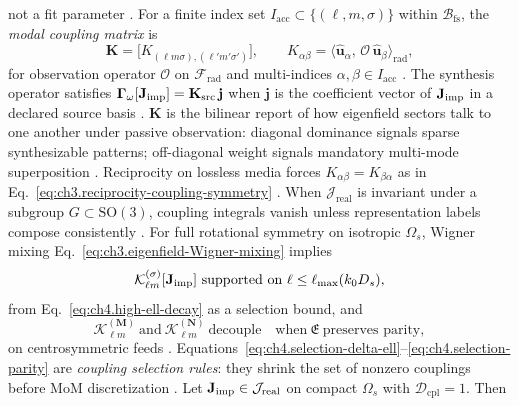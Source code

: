 not a fit parameter \cite{devaney2004}.
\label{def:ch4.modal-coupling-matrix}
For a finite index set \(I_{\mathrm{acc}}\subset\{(\ell,m,\sigma)\}\) within \(\mathcal{B}_{\mathrm{fs}}\), the
\emph{modal coupling matrix} is
\begin{equation}
\label{eq:ch4.modal-coupling-matrix}
\mathbf{K}
=
\big[K_{(\ell m\sigma),(\ell'm'\sigma')}\big],
\qquad
K_{\alpha\beta}
=
\big\langle
\widehat{\mathbf{u}}_{\alpha},\,
\mathcal{O}\,\widehat{\mathbf{u}}_{\beta}
\big\rangle_{\mathrm{rad}},
\end{equation}
for observation operator \(\mathcal{O}\) on \(\mathcal{F}_{\mathrm{rad}}\) and multi-indices
\(\alpha,\beta\in I_{\mathrm{acc}}\) \cite{harrington2001}. The synthesis operator satisfies
\(\boldsymbol{\Gamma}_\omega[\mathbf{J}_{\mathrm{imp}}]=\mathbf{K}_{\mathrm{src}}\,\mathbf{j}\) when \(\mathbf{j}\) is the coefficient
vector of \(\mathbf{J}_{\mathrm{imp}}\) in a declared source basis \cite{devaney2004}.
\(\mathbf{K}\) is the bilinear report of how eigenfield sectors talk to one another under passive
observation: diagonal dominance signals sparse synthesizable patterns; off-diagonal weight signals mandatory multi-mode
superposition \cite{hansen1988}. Reciprocity on lossless media forces
\(K_{\alpha\beta}=K_{\beta\alpha}\) as in Eq.~\eqref{eq:ch3.reciprocity-coupling-symmetry} \cite{stratton1941}.
When \(\mathcal{J}_{\mathrm{real}}\) is invariant under a subgroup \(G\subset\mathrm{SO}(3)\), coupling integrals
vanish unless representation labels compose consistently \cite{jackson1999}. For full rotational symmetry on
isotropic \(\Omega_{s}\), Wigner mixing Eq.~\eqref{eq:ch3.eigenfield-Wigner-mixing} implies
\begin{equation}
\label{eq:ch4.selection-delta-ell}
\mathcal{K}_{\ell m}^{(\sigma)}[\Jimp]
\ \text{supported on}\ 
\ell\le\ell_{\max}(k_{0}D_{s}),
\end{equation}
from Eq.~\eqref{eq:ch4.high-ell-decay} as a selection bound, and
\begin{equation}
\label{eq:ch4.selection-parity}
\mathcal{K}_{\ell m}^{(\mathbf{M})}\ \text{and}\ \mathcal{K}_{\ell m}^{(\mathbf{N})}\ \text{decouple}
\quad\text{when}\ \mathfrak{E}\ \text{preserves parity},
\end{equation}
on centrosymmetric feeds \cite{stratton1941}. Equations~\eqref{eq:ch4.selection-delta-ell}--\eqref{eq:ch4.selection-parity}
are \emph{coupling selection rules}: they shrink the set of nonzero couplings before MoM discretization
\cite{harrington2001}.
\label{thm:ch4.coupling-selection-rules}
Let \(\mathbf{J}_{\mathrm{imp}}\in\mathcal{J}_{\mathrm{real}}\) on compact \(\Omega_{s}\) with \(\mathcal{D}_{\mathrm{cpl}}=1\). Then
